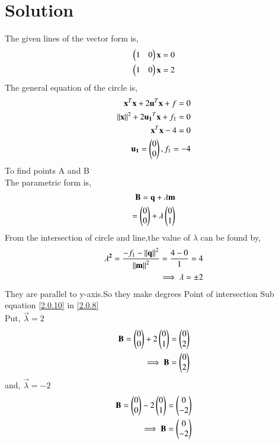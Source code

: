 \documentclass[journal,12pt,twocolumn]{IEEEtran}
\begin{document}
\section{Solution}
The given lines of the vector form is,
\begin{align}
\begin{pmatrix}1 & 0\end{pmatrix}\mathbf{x}=0
\\
\begin{pmatrix}1 & 0\end{pmatrix}\mathbf{x}=2
\end{align}
The general equation of the circle is,
\begin{align}
\mathbf{x}^T\mathbf{x} + 2\mathbf{u}^T\mathbf{x} + f = 0  
\\
\left\lVert\mathbf{x}\right\rVert^2 + 2\mathbf{u_1}^T\mathbf{x} + f_1 = 0
\\
\mathbf{x}^T\mathbf{x}- 4 = 0
\\
\mathbf{u_1} = \begin{pmatrix}0 \\ 0\end{pmatrix},f_1=-4
\end{align}
To find points A and B
\\
The parametric form is,
\begin{align}
\mathbf{B}=\mathbf{q}+\lambda \mathbf{m}\\
=\begin{pmatrix}0\\0\end{pmatrix}+\lambda \begin{pmatrix}0\\1\end{pmatrix} \label{2.0.8}
\end{align}
From the intersection of circle and line,the value of $\lambda$ can be found by,
\begin{align}
\mathbf{\lambda^2}=\frac{{{-f_1}-\left\lVert\mathbf{q}\right\rVert^2 }}{{\left\lVert\mathbf{m}\right\rVert^2}}=\frac{{{4}-{0} }}{{ {1 }}}=4
\\
\implies \mathbf{\lambda}=\pm{2} \label{2.0.10}
\end{align}
They are parallel to y-axis.So they make  degrees
 Point of intersection
Sub equation \eqref{2.0.10} in \eqref{2.0.8}
\\
Put, $\vec{\lambda}= 2$
\begin{align}
\mathbf{B}=\begin{pmatrix}0\\0\end{pmatrix}+2\begin{pmatrix}0\\ 1\end{pmatrix}=\begin{pmatrix}0 \\ 2\end{pmatrix}
\\ 
\implies\mathbf{B}=\begin{pmatrix}0\\2\end{pmatrix}
\end{align}
and, $\vec{\lambda}=-2$
\begin{align}
\mathbf{B}=\begin{pmatrix}0 \\0\end{pmatrix}-2\begin{pmatrix}0\\1\end{pmatrix}=\begin{pmatrix}0 \\ -2\end{pmatrix}
\\ 
\implies\mathbf{B}=\begin{pmatrix}0\\ -2\end{pmatrix}
\end{align}
\end{document}
